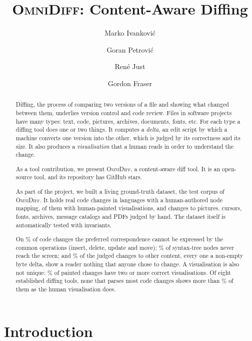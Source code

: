 \documentclass[sigconf,review]{acmart}
\title{\textsc{OmniDiff}: Content-Aware Diffing}
\author{Marko Ivankovi\'{c}}
\affiliation{%
  \institution{Universit\"{a}t Passau}
  \city{Passau}
  \country{Germany}
}
\author{Goran Petrovi\'{c}}
\affiliation{%
  \institution{Universit\"{a}t Passau}
  \city{Passau}
  \country{Germany}
}
\author{Ren\'{e} Just}
\affiliation{%
  \institution{University of Washington}
  \city{Seattle}
  \country{USA}
}
\author{Gordon Fraser}
\affiliation{%
  \institution{Universit\"{a}t Passau}
  \city{Passau}
  \country{Germany}
}
\begin{document}
\begin{abstract}
Diffing, the process of comparing two versions of a file and showing what changed between them,
underlies version control and code review. Files in software projects have many types: text,
code, pictures, archives, documents, fonts, etc. For each type a diffing tool does one or two
things. It computes a \emph{delta}, an edit script by which a machine converts one version
into the other, which is judged by its correctness and its size. It also produces a
\emph{visualisation} that a human reads in order to understand the change.

As a tool contribution, we present \textsc{OmniDiff}, a content-aware diff tool. It is an open-source
tool, and its repository has \ProjectStars{} GitHub stars.

As part of the project, we built a living ground-truth dataset, the test corpus of
\textsc{OmniDiff}. It holds
\NumFixtures{} real code changes in \NumFixtureLanguages{} languages with a human-authored node
mapping, \PresetPainted{} of them with human-painted visualisations, and \ContentAccAllJudged{}
changes to pictures, cursors, fonts, archives, message catalogs and PDFs judged by hand. The
dataset itself is automatically tested with \InvariantCount{} invariants.

On \AmbiguityListPct{}\% of code changes the preferred
correspondence cannot be expressed by the common operations (insert, delete, update and move);
\InvisibleNodeShare{}\% of syntax-tree nodes never reach the screen; and
\ContentVerdictNothingPct{}\% of the judged changes to other content, every one a non-empty byte
delta, show a reader nothing that anyone chose to change. A visualisation is also not unique:
\PresetBothPct{}\% of painted changes have two or more correct visualisations. Of eight
established diffing tools, none that parses most code changes shows more than
\DifftasticPaintingLinePerfectPct{}\% of them as the human visualisation does.
\end{abstract}

\maketitle

\section{Introduction}
\label{sec:intro}
\end{document}

